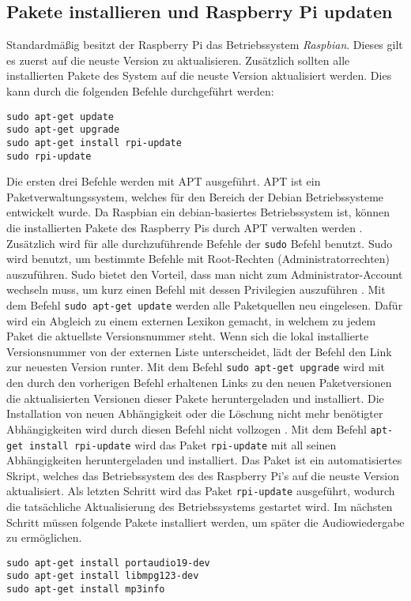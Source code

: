 \subsection{Pakete installieren und Raspberry Pi updaten}
Standardmäßig besitzt der Raspberry Pi das Betriebssystem \textit{Raspbian}.
Dieses gilt es zuerst auf die neuste Version zu aktualisieren. Zusätzlich
sollten alle installierten Pakete des System auf die neuste Version aktualisiert
werden. Dies kann durch die folgenden Befehle durchgeführt werden:
\begin{lstlisting}[caption={Aktualisieren des Raspberry Pi}]
sudo apt-get update 
sudo apt-get upgrade 
sudo apt-get install rpi-update 
sudo rpi-update
\end{lstlisting}
Die ersten drei Befehle werden mit \ac{APT} ausgeführt. \ac{APT} ist ein
Paketverwaltungssystem, welches für den Bereich der Debian Betriebssysteme
entwickelt wurde. Da Raspbian ein debian-basiertes Betriebssystem ist, können
die installierten Pakete des Raspberry Pis durch \ac{APT} verwalten werden
\autocite{apt-debian-wiki_2019}. Zusätzlich wird für alle durchzuführende
Befehle der \verb|sudo| Befehl benutzt. \ac{Sudo} wird benutzt, um
bestimmte Befehle mit Root-Rechten (Administratorrechten) auszuführen.
\ac{Sudo} bietet den Vorteil, dass man nicht zum Administrator-Account wechseln
muss, um kurz einen Befehl mit dessen Privilegien auszuführen
\autocite{moeller_2013}. Mit dem Befehl \verb|sudo apt-get update| werden alle
Paketquellen neu eingelesen. Dafür wird ein Abgleich zu einem externen Lexikon
gemacht, in welchem zu jedem Paket die aktuellste Versionsnummer steht. Wenn
sich die lokal installierte Versionsnummer von der externen Liste
unterscheidet, lädt der Befehl den Link zur neuesten Version runter.
Mit dem Befehl \verb|sudo apt-get upgrade| wird mit den durch den vorherigen
Befehl erhaltenen Links zu den neuen Paketversionen die aktualisierten
Versionen dieser Pakete heruntergeladen und installiert. Die Installation von
neuen Abhängigkeit oder die Löschung nicht mehr benötigter Abhängigkeiten wird
durch diesen Befehl nicht vollzogen \autocite{apt-get-wiki_2019}. Mit dem Befehl
\verb|apt-get install rpi-update| wird das Paket \verb|rpi-update| mit all
seinen Abhängigkeiten heruntergeladen und installiert. Das Paket ist ein
automatisiertes Skript, welches das Betriebssystem des des Raspberry Pi's auf die
neuste Version aktualisiert. Als letzten Schritt wird das Paket \verb|rpi-update|
ausgeführt, wodurch die tatsächliche Aktualisierung des Betriebssystems gestartet wird.
\newline 
Im nächsten Schritt müssen folgende Pakete installiert werden, um später die
Audiowiedergabe zu ermöglichen. 
\begin{lstlisting}[caption={Installation benötigter Pakete}]
sudo apt-get install portaudio19-dev
sudo apt-get install libmpg123-dev
sudo apt-get install mp3info 
\end{lstlisting}

